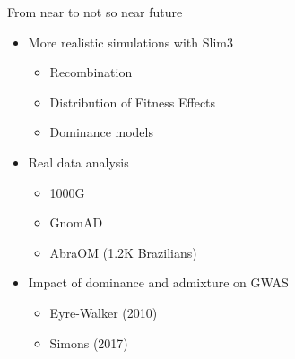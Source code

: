 \documentclass[10pt]{beamer}
\begin{document}
\begin{frame}[t]{From near to not so near future}
  \begin{itemize}
    \item More realistic simulations with Slim3
      \begin{itemize}
        \item Recombination
        \item Distribution of Fitness Effects
        \item Dominance models
      \end{itemize}
    \item Real data analysis
      \begin{itemize}
        \item 1000G 
        \item GnomAD 
        \item AbraOM (1.2K Brazilians)
      \end{itemize}
    \item Impact of dominance and admixture on GWAS
      \begin{itemize}
        \item Eyre-Walker (2010)   
        \item Simons (2017)
      \end{itemize}
  \end{itemize}
\end{frame}
\end{document}
